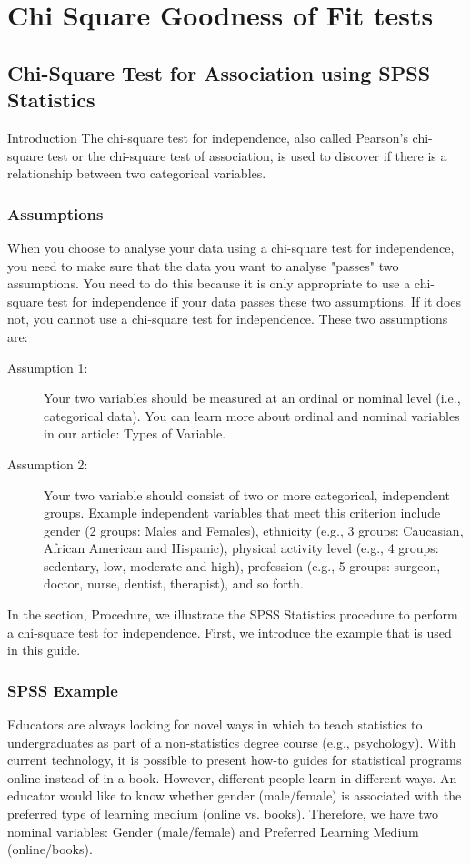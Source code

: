 \documentclass[00-IntroStatsMaster.tex]{subfiles}
\begin{document}
	
\chapter{Chi Square Goodness of Fit tests}







\section{Chi-Square Test for Association using SPSS Statistics}

Introduction
The chi-square test for independence, also called Pearson's chi-square test or the chi-square test of association, is used to discover if there is a relationship between two categorical variables.


\subsection{Assumptions}
When you choose to analyse your data using a chi-square test for independence, you need to make sure that the data you want to analyse "passes" two assumptions. You need to do this because it is only appropriate to use a chi-square test for independence if your data passes these two assumptions. If it does not, you cannot use a chi-square test for independence. These two assumptions are:

\begin{description}
	\item[Assumption 1:] Your two variables should be measured at an ordinal or nominal level (i.e., categorical data). You can learn more about ordinal and nominal variables in our article: Types of Variable.
	\item[Assumption 2:] Your two variable should consist of two or more categorical, independent groups. Example independent variables that meet this criterion include gender (2 groups: Males and Females), ethnicity (e.g., 3 groups: Caucasian, African American and Hispanic), physical activity level (e.g., 4 groups: sedentary, low, moderate and high), profession (e.g., 5 groups: surgeon, doctor, nurse, dentist, therapist), and so forth.
\end{description}
In the section, Procedure, we illustrate the SPSS Statistics procedure to perform a chi-square test for independence. First, we introduce the example that is used in this guide.


\subsection{SPSS Example}
Educators are always looking for novel ways in which to teach statistics to undergraduates as part of a non-statistics degree course (e.g., psychology). With current technology, it is possible to present how-to guides for statistical programs online instead of in a book. However, different people learn in different ways. An educator would like to know whether gender (male/female) is associated with the preferred type of learning medium (online vs. books). Therefore, we have two nominal variables: Gender (male/female) and Preferred Learning Medium (online/books).
\end{document}
